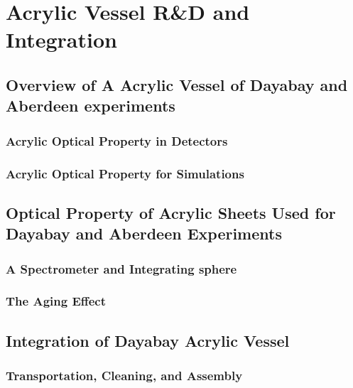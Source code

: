\chapter {Acrylic Vessel R\&D and Integration}

\section {Overview of A Acrylic Vessel of Dayabay and Aberdeen experiments}

\subsection {Acrylic Optical Property in Detectors}

\subsection {Acrylic Optical Property for Simulations}

\section {Optical Property of Acrylic Sheets Used for Dayabay and Aberdeen Experiments}

\subsection {A Spectrometer and Integrating sphere}

\subsection {The Aging Effect}


\section {Integration of Dayabay Acrylic Vessel}

\subsection {Transportation, Cleaning, and Assembly}
